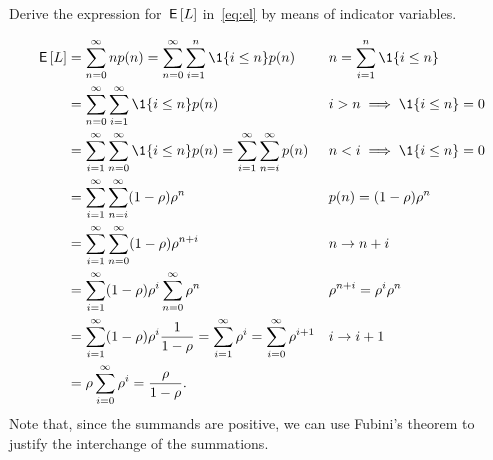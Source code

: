 \begin{exercise}
Derive the expression for $\,\mathsf{E}\left[L\right]$ in~\cref{eq:el} by means of indicator variables.
\begin{solution}
\begin{align*}
\E\L &= \sum_{n=0}^\infty n p(n) = \sum_{n=0}^\infty \sum_{i=1}^n \1{i\leq n} p(n) && n=\sum_{i=1}^n \1{i\leq n}\\
&= \sum_{n=0}^\infty \sum_{i=1}^\infty \1{i\leq n} p(n) && i>n\implies \1{i\leq n} = 0\\
&= \sum_{i=1}^\infty \sum_{n=0}^\infty \1{i\leq n} p(n) = \sum_{i=1}^\infty \sum_{n=i}^\infty p(n) && n < i \implies \1{i\leq n}=0 \\
&= \sum_{i=1}^\infty \sum_{n=i}^\infty (1-\rho)\rho^n && p(n) = (1-\rho)\rho^n \\
&= \sum_{i=1}^\infty \sum_{n=0}^\infty (1-\rho)\rho^{n+i} && n\to n+i \\
&= \sum_{i=1}^\infty (1-\rho)\rho^i \sum_{n=0}^\infty \rho^n && \rho^{n+i}=\rho^i \rho^n\\
&= \sum_{i=1}^\infty (1-\rho)\rho^i \frac1{1-\rho} = \sum_{i=1}^\infty \rho^i = \sum_{i=0}^\infty \rho^{i+1} && i\to i+1\\
&= \rho \sum_{i=0}^\infty \rho^i = \frac{\rho}{1-\rho}.
\end{align*}
Note that, since the summands are positive, we can use Fubini's theorem
to justify the interchange of the summations.
\end{solution}
\end{exercise}


